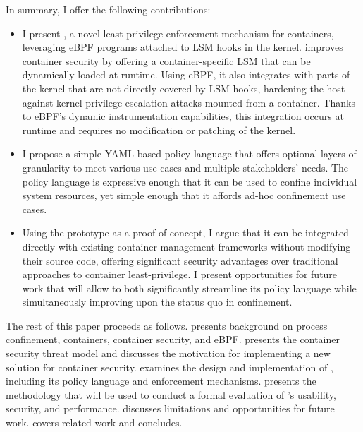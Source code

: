 In summary, I offer the following contributions:
\begin{itemize}
  \item I present \bpfcontain{}, a novel least-privilege enforcement mechanism for containers, leveraging eBPF programs attached to LSM hooks in the kernel. \bpfcontain{} improves container security by offering a container-specific LSM that can be dynamically loaded at runtime. Using eBPF, it also integrates with parts of the kernel that are not directly covered by LSM hooks, hardening the host against kernel privilege escalation attacks mounted from a container. Thanks to eBPF's dynamic instrumentation capabilities, this integration occurs at runtime and requires no modification or patching of the kernel.

  \item I propose a simple YAML-based policy language that offers optional layers of granularity to meet various use cases and multiple stakeholders' needs. The policy language is expressive enough that it can be used to confine individual system resources, yet simple enough that it affords ad-hoc confinement use cases.

  \item Using the \bpfcontain{} prototype as a proof of concept, I argue that it can be integrated directly with existing container management frameworks without modifying their source code, offering significant security advantages over traditional approaches to container least-privilege. I present opportunities for future work that will allow \bpfcontain{} to both significantly streamline its policy language while simultaneously improving upon the status quo in confinement.
\end{itemize}

The rest of this paper proceeds as follows.  presents background on process confinement, containers, container security, and eBPF.  presents the container security threat model and discusses the motivation for implementing a new solution for container security.  examines the design and implementation of \bpfcontain{}, including its policy language and enforcement mechanisms.  presents the methodology that will be used to conduct a formal evaluation of \bpfcontain{}'s usability, security, and performance.  discusses limitations and opportunities for future work.  covers related work and  concludes.
